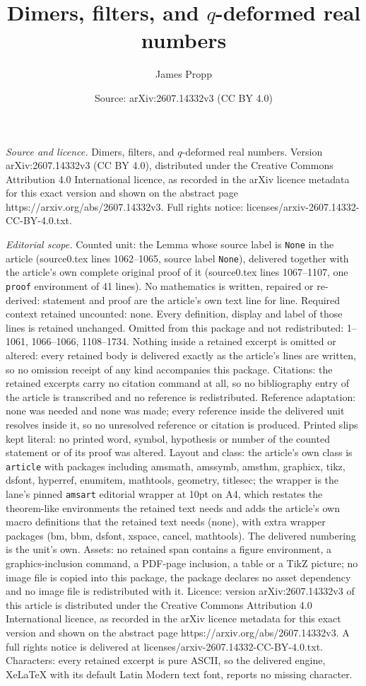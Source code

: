 \documentclass[10pt,a4paper]{amsart}
\title[Dimers, filters, and $q$-deformed real numbers]{Dimers, filters, and $q$-deformed real numbers}
\author{James Propp}
\date{Source: arXiv:2607.14332v3 (CC BY 4.0)}
\begin{document}
\maketitle

\noindent\emph{Source and licence.} Dimers, filters, and $q$-deformed real numbers. Version arXiv:2607.14332v3 (CC BY 4.0), distributed under the Creative Commons Attribution 4.0 International licence, as recorded in the arXiv licence metadata for this exact version and shown on the abstract page https://arxiv.org/abs/2607.14332v3. Full rights notice: licenses/arxiv-2607.14332-CC-BY-4.0.txt.\par\smallskip

\noindent\textit{Editorial scope.} Counted unit: the Lemma whose source label is \texttt{None} in the article (source0.tex lines 1062--1065, source label \texttt{None}), delivered together with the article's own complete original proof of it (source0.tex lines 1067--1107, one \texttt{proof} environment of 41 lines). No mathematics is written, repaired or re-derived: statement and proof are the article's own text line for line. Required context retained uncounted: none. Every definition, display and label of those lines is retained unchanged. Omitted from this package and not redistributed: 1--1061, 1066--1066, 1108--1734. Nothing inside a retained excerpt is omitted or altered: every retained body is delivered exactly as the article's lines are written, so no omission receipt of any kind accompanies this package. Citations: the retained excerpts carry no citation command at all, so no bibliography entry of the article is transcribed and no reference is redistributed. Reference adaptation: none was needed and none was made; every reference inside the delivered unit resolves inside it, so no unresolved reference or citation is produced. Printed slips kept literal: no printed word, symbol, hypothesis or number of the counted statement or of its proof was altered. Layout and class: the article's own class is \texttt{article} with packages including amsmath, amssymb, amsthm, graphicx, tikz, dsfont, hyperref, enumitem, mathtools, geometry, titlesec; the wrapper is the lane's pinned \texttt{amsart} editorial wrapper at 10pt on A4, which restates the theorem-like environments the retained text needs and adds the article's own macro definitions that the retained text needs (none), with extra wrapper packages (bm, bbm, dsfont, xspace, cancel, mathtools). The delivered numbering is the unit's own. Assets: no retained span contains a figure environment, a graphics-inclusion command, a PDF-page inclusion, a table or a TikZ picture; no image file is copied into this package, the package declares no asset dependency and no image file is redistributed with it. Licence: version arXiv:2607.14332v3 of this article is distributed under the Creative Commons Attribution 4.0 International licence, as recorded in the arXiv licence metadata for this exact version and shown on the abstract page https://arxiv.org/abs/2607.14332v3. A full rights notice is delivered at licenses/arxiv-2607.14332-CC-BY-4.0.txt. Characters: every retained excerpt is pure ASCII, so the delivered engine, XeLaTeX with its default Latin Modern text font, reports no missing character.
\end{document}
